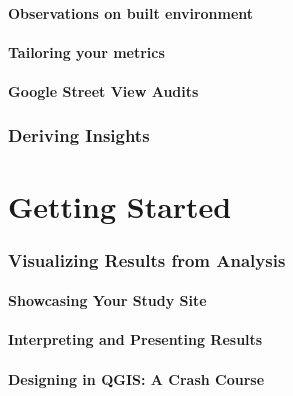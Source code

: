 \documentclass[
]{latex/krantz}
\begin{document}
\hypertarget{observations-on-built-environment}{%
\subsection{Observations on built environment}\label{observations-on-built-environment}}

\hypertarget{tailoring-your-metrics}{%
\subsection{Tailoring your metrics}\label{tailoring-your-metrics}}

\hypertarget{google-street-view-audits}{%
\subsection{Google Street View Audits}\label{google-street-view-audits}}

\hypertarget{deriving-insights}{%
\section{Deriving Insights}\label{deriving-insights}}

\hypertarget{part-getting-started-1}{%
\part{Getting Started}\label{part-getting-started-1}}

\hypertarget{visualizing-results-from-analysis}{%
\section{Visualizing Results from Analysis}\label{visualizing-results-from-analysis}}

\hypertarget{showcasing-your-study-site}{%
\subsection{Showcasing Your Study Site}\label{showcasing-your-study-site}}

\hypertarget{interpreting-and-presenting-results}{%
\subsection{Interpreting and Presenting Results}\label{interpreting-and-presenting-results}}

\hypertarget{designing-in-qgis-a-crash-course}{%
\subsection{Designing in QGIS: A Crash Course}\label{designing-in-qgis-a-crash-course}}
\end{document}
